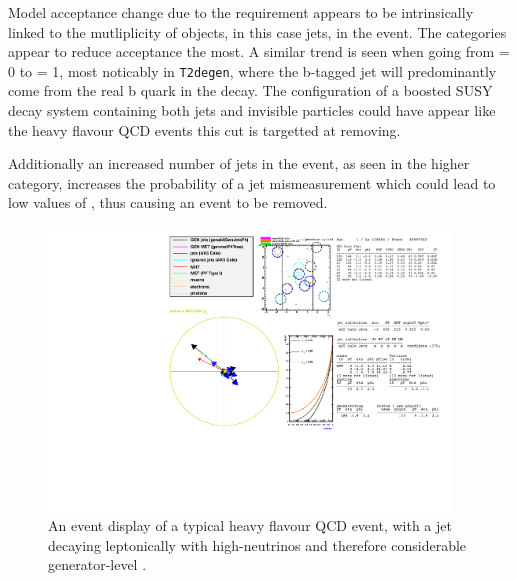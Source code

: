 Model acceptance change due to the requirement appears to be intrinsically
linked to the mutliplicity of objects, in this case jets, in the event. The
\njhigh categories appear to reduce acceptance the most. A similar trend is
seen when going from \nb = 0 to \nb = 1, most noticably in \texttt{T2degen},
where the b-tagged jet will predominantly come from the real b quark in the
decay. The configuration of a boosted SUSY decay system containing both jets and
invisible \chiz particles could have appear like the heavy flavour QCD events
this cut is targetted at removing. 

Additionally an increased number of jets in the event, as seen in the higher \nj
category, increases the probability of a jet mismeasurement which could lead to
low values of \mindphistar, thus causing an event to be removed.

\clearpage
\begin{figure}
    \centering
    \includegraphics[width=0.95\textwidth]
    {Figs/eventDisplays/Had_QCD_MG_MC_HT375_skim_displays_singleEvent_2_noPF.pdf}
    \caption{An event display of a typical heavy flavour QCD event, with a jet
    decaying leptonically with high-\Pt neutrinos and therefore considerable
    generator-level \met.}
    \label{fig:event_display_QCD}
\end{figure}
